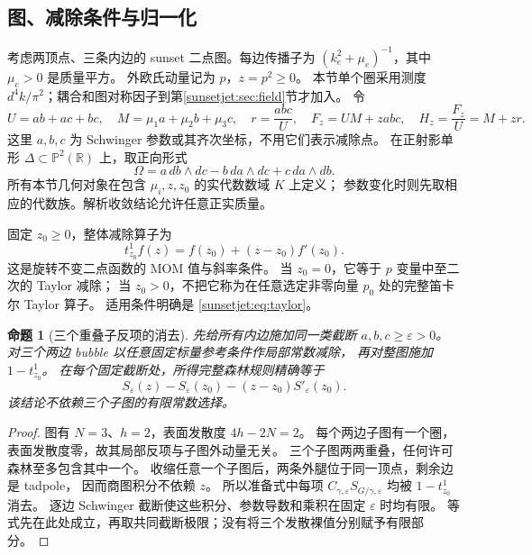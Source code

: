 \documentclass[11pt,a4paper,oneside]{ctexart}
\theoremstyle{cnplain}
\newtheorem{proposition}[theorem]{命题}
\theoremstyle{definition}
\theoremstyle{remark}
\newcommand{\Q}{\mathbb Q}
\newcommand{\im}{\operatorname{im}}
\newcommand{\dR}{\mathrm{dR}}
\numberwithin{equation}{section}
\begin{document}
\begingroup
\providecommand{\Q}{\mathbb Q}
\providecommand{\A}{\mathbb A}
\providecommand{\PP}{\mathbb P}
\providecommand{\per}{\operatorname{per}}
\providecommand{\im}{\operatorname{im}}
\providecommand{\dR}{\mathrm{dR}}
\providecommand{\SR}{S_{\mathrm R}}
\subsection{图、减除条件与归一化}
考虑两顶点、三条内边的 sunset 二点图。每边传播子为
$(k_e^2+\mu_e)^{-1}$，其中 $\mu_e>0$ 是质量平方。
外欧氏动量记为 $p$，$z=p^2\geq0$。
本节单个圈采用测度 $d^4k/\pi^2$；耦合和图对称因子到第\ref{sunsetjet:sec:field}节才加入。
令
\begin{equation}\label{sunsetjet:eq:poly}
 U=ab+ac+bc,\quad M=\mu_1a+\mu_2b+\mu_3c,\quad
 r=\frac{abc}{U},\quad F_z=UM+zabc,\quad H_z=\frac{F_z}{U}=M+zr.
\end{equation}
这里 $a,b,c$ 为 Schwinger 参数或其齐次坐标，不用它们表示减除点。
在正射影单形 $\Delta\subset\PP^2(\mathbb R)$ 上，取正向形式
\[
 \Omega=a\,db\wedge dc-b\,da\wedge dc+c\,da\wedge db.
\]
所有本节几何对象在包含 $\mu_i,z,z_0$ 的实代数数域 $K$ 上定义；
参数变化时则先取相应的代数族。解析收敛结论允许任意正实质量。

固定 $z_0\geq0$，整体减除算子为
\begin{equation}\label{sunsetjet:eq:taylor}
 t_{z_0}^1 f(z)=f(z_0)+(z-z_0)f'(z_0).
\end{equation}
这是旋转不变二点函数的 MOM 值与斜率条件。
当 $z_0=0$，它等于 $p$ 变量中至二次的 Taylor 减除；
当 $z_0>0$，不把它称为在任意选定非零向量 $p_0$ 处的完整笛卡尔 Taylor 算子。
适用条件明确是 \eqref{sunsetjet:eq:taylor}。

\begin{proposition}[三个重叠子反项的消去]\label{sunsetjet:prop:forest}
先给所有内边施加同一类截断 $a,b,c\geq\varepsilon>0$。
对三个两边 bubble 以任意固定标量参考条件作局部常数减除，
再对整图施加 $1-t_{z_0}^1$。
在每个固定截断处，所得完整森林规则精确等于
\begin{equation}\label{sunsetjet:eq:regulated}
 S_\varepsilon(z)-S_\varepsilon(z_0)
          -(z-z_0)S'_\varepsilon(z_0).
\end{equation}
该结论不依赖三个子图的有限常数选择。
\end{proposition}
\begin{proof}
图有 $N=3$、$h=2$，表面发散度 $4h-2N=2$。
每个两边子图有一个圈，表面发散度零，故其局部反项与子图外动量无关。
三个子图两两重叠，任何许可森林至多包含其中一个。
收缩任意一个子图后，两条外腿位于同一顶点，剩余边是 tadpole，
因而商图积分不依赖 $z$。
所以准备式中每项 $C_{\gamma,\varepsilon}S_{G/\gamma,\varepsilon}$
均被 $1-t_{z_0}^1$ 消去。
逐边 Schwinger 截断使这些积分、参数导数和乘积在固定 $\varepsilon$ 时均有限。
等式先在此处成立，再取共同截断极限；没有将三个发散裸值分别赋予有限部分。
\end{proof}
\end{document}

